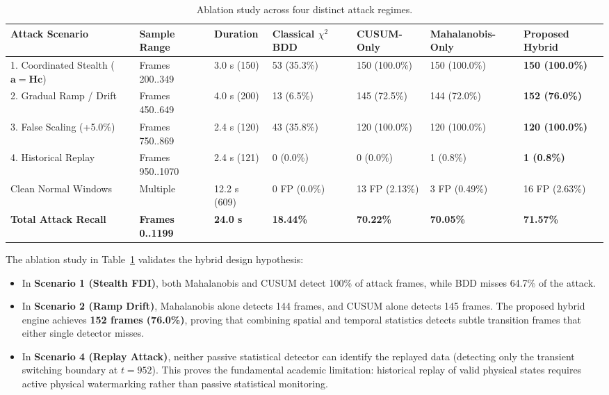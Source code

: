 \documentclass[12pt,a4paper]{report}
\begin{document}
\begin{table}[H]
\centering
\caption{Ablation study across four distinct attack regimes.}
\label{tab:ablation_study}
\small
\renewcommand{\arraystretch}{1.25}
\begin{tabular}{|p{3.8cm}|p{1.8cm}|p{1.6cm}|p{2.0cm}|p{1.8cm}|p{1.8cm}|p{2.0cm}|}
\hline
\textbf{Attack Scenario} & \textbf{Sample Range} & \textbf{Duration} & \textbf{Classical $\chi^2$ BDD} & \textbf{CUSUM-Only} & \textbf{Mahalanobis-Only} & \textbf{Proposed Hybrid} \\
\hline
1. Coordinated Stealth ($\boldsymbol{a}=\boldsymbol{H}\boldsymbol{c}$) & Frames 200..349 & 3.0 s (150) & 53 (35.3\%) & 150 (100.0\%) & 150 (100.0\%) & \textbf{150 (100.0\%)} \\
\hline
2. Gradual Ramp / Drift & Frames 450..649 & 4.0 s (200) & 13 (6.5\%) & 145 (72.5\%) & 144 (72.0\%) & \textbf{152 (76.0\%)} \\
\hline
3. False Scaling (+5.0\%) & Frames 750..869 & 2.4 s (120) & 43 (35.8\%) & 120 (100.0\%) & 120 (100.0\%) & \textbf{120 (100.0\%)} \\
\hline
4. Historical Replay & Frames 950..1070 & 2.4 s (121) & 0 (0.0\%) & 0 (0.0\%) & 1 (0.8\%) & \textbf{1 (0.8\%)} \\
\hline
Clean Normal Windows & Multiple & 12.2 s (609) & 0 FP (0.0\%) & 13 FP (2.13\%) & 3 FP (0.49\%) & 16 FP (2.63\%) \\
\hline
\textbf{Total Attack Recall} & \textbf{Frames 0..1199} & \textbf{24.0 s} & \textbf{18.44\%} & \textbf{70.22\%} & \textbf{70.05\%} & \textbf{71.57\%} \\
\hline
\end{tabular}
\end{table}

The ablation study in Table~\ref{tab:ablation_study} validates the hybrid design hypothesis:
\begin{itemize}
    \item In \textbf{Scenario 1 (Stealth FDI)}, both Mahalanobis and CUSUM detect 100\% of attack frames,
    while BDD misses 64.7\% of the attack.
    \item In \textbf{Scenario 2 (Ramp Drift)}, Mahalanobis alone detects 144 frames, and CUSUM alone
    detects 145 frames. The proposed hybrid engine achieves \textbf{152 frames (76.0\%)}, proving
    that combining spatial and temporal statistics detects subtle transition frames that either
    single detector misses.
    \item In \textbf{Scenario 4 (Replay Attack)}, neither passive statistical detector can identify
    the replayed data (detecting only the transient switching boundary at $t=952$). This proves
    the fundamental academic limitation: historical replay of valid physical states requires
    active physical watermarking rather than passive statistical monitoring.
\end{itemize}
\end{document}

